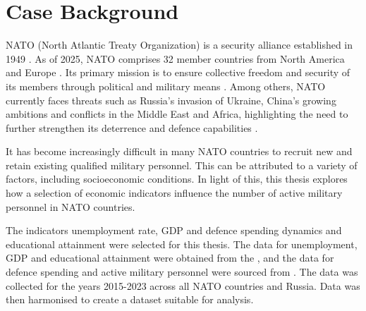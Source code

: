 \chapter{Case Background}

NATO (North Atlantic Treaty Organization) is a security
alliance established in 1949 \parencite{us_mission_to_nato_about_nodate}. As of 2025, NATO
comprises 32 member countries from North America and Europe \parencite{nato_what_nodate}.
Its primary mission is to ensure collective freedom and security of its members through 
political and military means \parencite{us_mission_to_nato_about_nodate}. Among others, NATO currently faces 
threats such as  Russia's invasion of Ukraine, China's growing ambitions and conflicts 
in the Middle East and Africa, highlighting the need to further strengthen its deterrence 
and defence capabilities \parencite{nato_nato_2022}.

It has become increasingly difficult in many NATO countries to recruit new 
and retain existing qualified military personnel. This can be attributed to 
a variety of factors, including socioeconomic conditions. \parencite{nato_research_and_technology_organization_recruiting_2007}
In light of this, this thesis explores how a selection of economic indicators 
influence the number of active military personnel in NATO countries.

The indicators unemployment rate, GDP and defence spending dynamics and educational 
attainment were selected for this thesis. The data for unemployment, GDP and educational 
attainment were obtained from the \textcite{noauthor_world_bank_nodate} , and the data for defence spending 
and active military personnel were sourced from \textcite{noauthor_military_balance_nodate}. The data 
was collected for the years 2015-2023 across all NATO countries and Russia. 
Data was then harmonised to create a dataset suitable for analysis.
